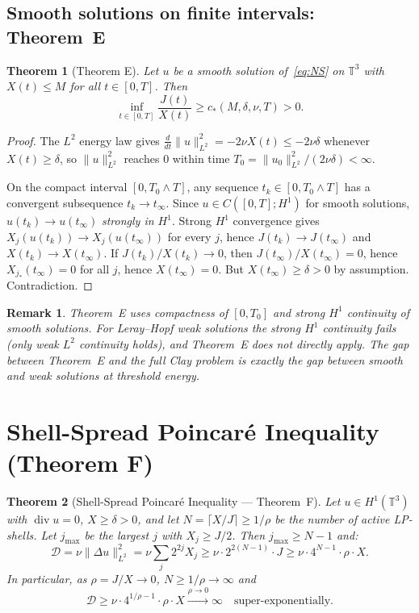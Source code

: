 \documentclass[11pt]{article}
\newtheorem{theorem}{Theorem}[section]
\newtheorem*{remark}{Remark}
\newcommand{\norm}[2]{\|{#1}\|_{#2}}
\newcommand{\T}{\mathbb{T}}
\newcommand{\ddt}{\tfrac{d}{dt}}
\newcommand{\DD}{\mathcal{D}}
\begin{document}
\subsection{Smooth solutions on finite intervals: Theorem~E}

\begin{theorem}[Theorem E]\label{thm:E}
Let $u$ be a smooth solution of~\eqref{eq:NS} on $\T^3$
with $X(t)\le M$ for all $t\in[0,T]$.
Then
\[
  \inf_{t\in[0,T]}\frac{J(t)}{X(t)}\ge c_*(M,\delta,\nu,T) > 0.
\]
\end{theorem}

\begin{proof}
The $L^2$ energy law gives
$\ddt\norm{u}{L^2}^2 = -2\nu X(t)\le-2\nu\delta$
whenever $X(t)\ge\delta$, so $\norm{u}{L^2}^2$ reaches $0$
within time $T_0 = \norm{u_0}{L^2}^2/(2\nu\delta) < \infty$.

On the compact interval $[0,T_0\wedge T]$, any sequence
$t_k\in[0,T_0\wedge T]$ has a convergent subsequence
$t_k\to t_\infty$.
Since $u\in C([0,T];H^1)$ for smooth solutions,
$u(t_k)\to u(t_\infty)$ \emph{strongly in $H^1$}.
Strong $H^1$ convergence gives $X_j(u(t_k))\to X_j(u(t_\infty))$
for every $j$, hence $J(t_k)\to J(t_\infty)$ and
$X(t_k)\to X(t_\infty)$.
If $J(t_k)/X(t_k)\to0$, then $J(t_\infty)/X(t_\infty)=0$,
hence $X_{j_*}(t_\infty)=0$ for all $j$, hence $X(t_\infty)=0$.
But $X(t_\infty)\ge\delta>0$ by assumption. Contradiction.
\end{proof}

\begin{remark}
Theorem~E uses compactness of $[0,T_0]$ and strong $H^1$
continuity of \emph{smooth} solutions.
For Leray--Hopf weak solutions the strong $H^1$ continuity
fails (only weak $L^2$ continuity holds), and Theorem~E
does not directly apply.
The gap between Theorem~E and the full Clay problem is exactly
the gap between smooth and weak solutions at threshold energy.
\end{remark}

\section{Shell-Spread Poincar\'e Inequality (Theorem F)}

\begin{theorem}[Shell-Spread Poincar\'e Inequality --- Theorem~F]
\label{thm:F}
Let $u\in H^1(\T^3)$ with $\operatorname{div}u=0$,
$X\ge\delta>0$, and let $N=\lceil X/J\rceil\ge1/\rho$
be the number of active LP-shells.
Let $j_{\max}$ be the largest $j$ with $X_j\ge J/2$.
Then $j_{\max}\ge N-1$ and:
\begin{equation}\label{eq:SSPI}
  \DD = \nu\norm{\Delta u}{L^2}^2
  = \nu\sum_j 2^{2j}X_j
  \ge \nu\cdot 2^{2(N-1)}\cdot J
  \ge \nu\cdot 4^{N-1}\cdot\rho\cdot X.
\end{equation}
In particular, as $\rho=J/X\to0$, $N\ge1/\rho\to\infty$ and
\[
  \DD \ge \nu\cdot 4^{1/\rho - 1}\cdot\rho\cdot X
  \xrightarrow{\rho\to0}\infty
  \quad\text{super-exponentially.}
\]
\end{theorem}
\end{document}
